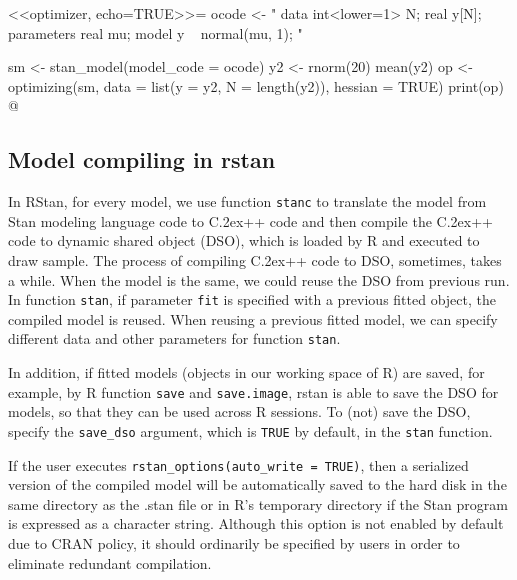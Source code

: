 \documentclass[12pt]{article}
\newcommand{\R}{R\xspace}
\newcommand{\RStan}{RStan\xspace}
\newcommand*{\Cpp}{C\raise.2ex\hbox{\footnotesize ++}\xspace} %
\newcommand{\code}[1]{{\tt #1}}
\newcommand{\strong}[1]{\texorpdfstring%
          {{\normalfont\fontseries{b}\selectfont #1}}%
            {#1}}
\let\pkg=\strong
\begin{document}
                <<optimizer, echo=TRUE>>= 
                  ocode <- "
                data {
                int<lower=1> N;
                real y[N];
                } 
                parameters {
                real mu;
                } 
                model {
                y ~ normal(mu, 1);
                } 
                "
                
                sm <- stan_model(model_code = ocode)
                y2 <- rnorm(20)
                mean(y2)
                op <- optimizing(sm, data = list(y = y2, N = length(y2)), hessian = TRUE)
                print(op)
                @
                  
                  
                  \subsection[Model compiling in rstan]{Model compiling in \pkg{rstan}}
                \label{subsecmodelcompiling}
                
                In \RStan, for every model, we use function \code{stanc} to translate the 
                model from Stan modeling language code to \Cpp code 
                and then compile the \Cpp code to dynamic shared object (DSO),
                which is loaded by \R and executed to draw sample. 
                The process of compiling \Cpp code to DSO, sometimes, takes a while. 
                When the model is the same, we could reuse the DSO from previous run. 
                In function \code{stan}, if parameter \code{fit} is specified
                with a previous fitted object, the compiled model is reused. 
                When reusing a previous fitted model, we can specify different 
                data and other parameters for function \code{stan}. 
                
                In addition, if fitted models (objects in our working space of \R)
                are saved, for example, by \R function
                \code{save} and \code{save.image}, \pkg{rstan} is able to save the 
                DSO for models, so that they can be used across \R sessions. 
                To (not) save the DSO, specify the \code{save\_dso} argument, which
                is \code{TRUE} by default, in the \code{stan} function.
                
                If the user executes \code{rstan\_options(auto\_write = TRUE)}, then
                a serialized version of the compiled model will be automatically
                saved to the hard disk in the same directory as the .stan file or
                in \R's temporary directory if the Stan program is expressed as 
                a character string. Although this option is not enabled by default
                due to CRAN policy, it should ordinarily be specified by users in
                order to eliminate redundant compilation.
                
\end{document}
